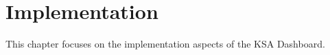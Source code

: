 \chapter{Implementation}
\label{chap:implementation}

This chapter focuses on the implementation aspects of the KSA Dashboard. 



